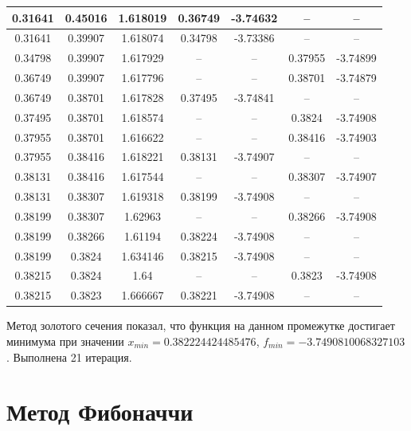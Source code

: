 \documentclass[12pt]{article}
\begin{document}
\begin{table}[h]
\begin{tabular}{|c|c|c|c|c|c|c|}
0.31641 & 0.45016 & 1.618019 & 0.36749 & -3.74632 & --      & --       \\ \hline
0.31641 & 0.39907 & 1.618074 & 0.34798 & -3.73386 & --      & --       \\ \hline
0.34798 & 0.39907 & 1.617929 & --      & --       & 0.37955 & -3.74899 \\ \hline
0.36749 & 0.39907 & 1.617796 & --      & --       & 0.38701 & -3.74879 \\ \hline
0.36749 & 0.38701 & 1.617828 & 0.37495 & -3.74841 & --      & --       \\ \hline
0.37495 & 0.38701 & 1.618574 & --      & --       & 0.3824  & -3.74908 \\ \hline
0.37955 & 0.38701 & 1.616622 & --      & --       & 0.38416 & -3.74903 \\ \hline
0.37955 & 0.38416 & 1.618221 & 0.38131 & -3.74907 & --      & --       \\ \hline
0.38131 & 0.38416 & 1.617544 & --      & --       & 0.38307 & -3.74907 \\ \hline
0.38131 & 0.38307 & 1.619318 & 0.38199 & -3.74908 & --      & --       \\ \hline
0.38199 & 0.38307 & 1.62963  & --      & --       & 0.38266 & -3.74908 \\ \hline
0.38199 & 0.38266 & 1.61194  & 0.38224 & -3.74908 & --      & --       \\ \hline
0.38199 & 0.3824  & 1.634146 & 0.38215 & -3.74908 & --      & --       \\ \hline
0.38215 & 0.3824  & 1.64     & --      & --       & 0.3823  & -3.74908 \\ \hline
0.38215 & 0.3823  & 1.666667 & 0.38221 & -3.74908 & --      & --       \\ \hline
\end{tabular}
\end{table}

Метод золотого сечения показал, что функция на данном промежутке достигает минимума при значении $x_{min} = 0.382224424485476$, $f_{min} = -3.7490810068327103$. Выполнена 21 итерация.

\newpage
\section{Метод Фибоначчи}
\end{document}

